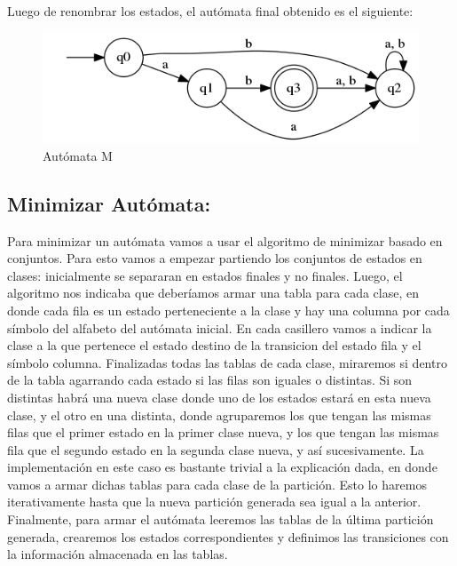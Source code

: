 Luego de renombrar los estados, el autómata final obtenido es el siguiente:

\vspace{2 mm}

\begin{figure}[!h]
  \begin{center}
        \includegraphics[scale = 0.5]{images/final.png}
      \caption{Autómata M}
      \label{fig:contra1}
  \end{center}
\end{figure}


\subsection{Minimizar Autómata:}
Para minimizar un autómata vamos a usar el algoritmo de minimizar basado en conjuntos. Para esto vamos a empezar partiendo los conjuntos de estados en clases: inicialmente se separaran en estados finales y no finales.\newline
Luego, el algoritmo nos indicaba que deberíamos armar una tabla para cada clase, en donde cada fila es un estado perteneciente a la clase y hay una columna por cada símbolo del alfabeto del autómata inicial. En cada casillero vamos a indicar la clase a la que pertenece el estado destino de la transicion del estado fila y el símbolo columna.\newline
Finalizadas todas las tablas de cada clase, miraremos si dentro de la tabla agarrando cada estado si las filas son iguales o distintas. Si son distintas habrá una nueva clase donde uno de los estados estará en esta nueva clase, y el otro en una distinta, donde agruparemos los que tengan las mismas filas que el primer estado en la primer clase nueva, y los que tengan las mismas fila que el segundo estado en la segunda clase nueva, y así sucesivamente.\newline
La implementación en este caso es bastante trivial a la explicación dada, en donde vamos a armar dichas tablas para cada clase de la partición. Esto lo haremos iterativamente hasta que la nueva partición generada sea igual a la anterior.
Finalmente, para armar el autómata leeremos las tablas de la última partición generada, crearemos los estados correspondientes
y definimos las transiciones con la información almacenada en las tablas.

